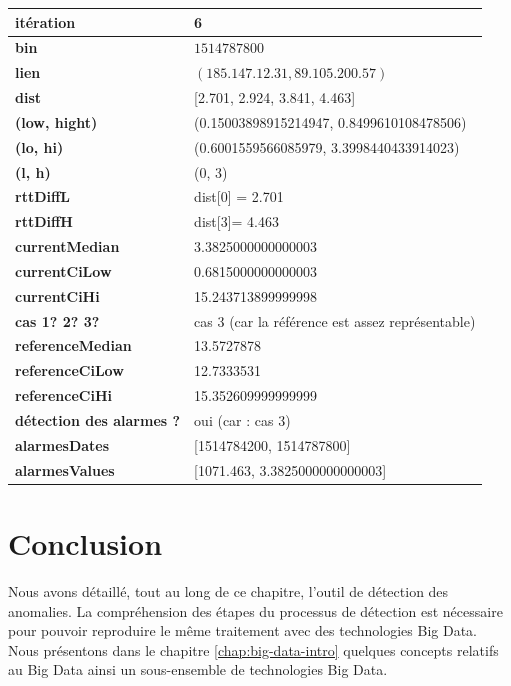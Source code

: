 \begin{table}[H]
	\centering
	
	\begin{tabularx}{\linewidth}{|l|X| }
		\hline
		\textbf{itération} & 6	\\ \hline
		\textbf{bin} & $1514787800$ \\ \hline
		\textbf{lien} & $(185.147.12.31, 89.105.200.57)$  \\ \hline
		\textbf{dist}& [2.701, 2.924, 3.841, 4.463]	\\ \hline
		\textbf{(low, hight)}& (0.15003898915214947, 0.8499610108478506) 	\\ \hline
		\textbf{(lo, hi)}&(0.6001559566085979, 3.3998440433914023)  \\ \hline
		\textbf{(l, h)} & (0, 3) 	\\ \hline
		\textbf{rttDiffL}& dist[0] = 2.701	\\ \hline
		\textbf{rttDiffH}& dist[3]= 4.463	\\ \hline
		\textbf{currentMedian}&  3.3825000000000003	\\ \hline
		\textbf{currentCiLow}& 0.6815000000000003 	\\ \hline
		\textbf{currentCiHi}& 15.243713899999998	\\ \hline
		\textbf{cas 1? 2? 3?}& cas 3 (car la référence est assez représentable)  \\ \hline
		\textbf{referenceMedian}& 13.5727878 	\\ \hline
		\textbf{referenceCiLow}&  12.7333531	\\ \hline
		\textbf{referenceCiHi}& 15.352609999999999 	\\ \hline
		\textbf{détection des alarmes ?}& oui (car : cas 3)	\\ \hline
		\textbf{alarmesDates}& [1514784200, 1514787800]	\\ \hline
		\textbf{alarmesValues}& [1071.463, 3.3825000000000003]	\\ \hline
	\end{tabularx}
\end{table}

\section{Conclusion}

Nous avons détaillé, tout au long de ce chapitre, l'outil de détection des anomalies. La compréhension des étapes du processus de détection est nécessaire pour pouvoir reproduire le même traitement avec des technologies Big Data. Nous présentons dans le chapitre \ref{chap:big-data-intro}   quelques concepts relatifs au Big Data ainsi un sous-ensemble de technologies Big Data.